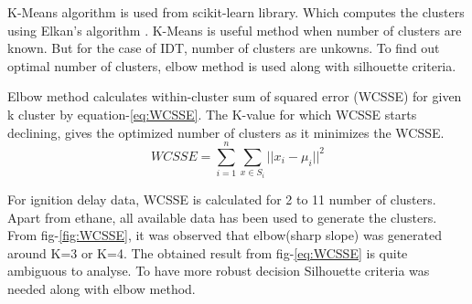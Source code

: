 \documentclass[preprint,12pt]{elsarticle}
\begin{document}
					K-Means algorithm is used from scikit-learn library. Which computes the clusters using  Elkan's algorithm \cite{scikit-learn}. K-Means is useful method when number of clusters are known. But for the case of IDT, number of clusters are unkowns. To find out optimal number of clusters, elbow method is used along with silhouette criteria.
					
					Elbow method calculates within-cluster sum of squared error (WCSSE) for given k cluster by equation-\ref{eq:WCSSE}.  The K-value for which WCSSE starts declining, gives the optimized number of clusters as   it minimizes the WCSSE.
					\begin{equation}\label{eq:WCSSE}
						WCSSE = \sum_{i=1}^{n} \sum_{x \in S_i} ||x_i - \mu_i||^2
					\end{equation}
					
					 For ignition delay data, WCSSE is calculated for 2 to 11 number of clusters. Apart from ethane, all available data has been used to generate the clusters.  From fig-\ref{fig:WCSSE}, it was observed that elbow(sharp slope) was generated around K=3 or K=4. The obtained result from fig-\ref{eq:WCSSE} is quite ambiguous to analyse. To have more robust decision Silhouette criteria was needed along with elbow method.
					 	 
\end{document}
